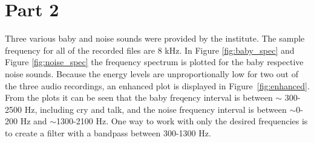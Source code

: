 \newpage
\section{Part 2}
Three various baby and noise sounds were provided by the institute. The sample
frequency for all of the recorded files are 8 kHz. In Figure
\ref{fig:baby_spec} and Figure \ref{fig:noise_spec} the frequency spectrum is
plotted for the baby respective noise sounds. Because the energy levels are
unproportionally low for two out of the three audio recordings, an enhanced
plot is displayed in Figure~\ref{fig:enhanced}.  From the plots it can be seen
that the baby freqency interval is between $\sim$ 300-2500 Hz, including cry
and talk, and the noise frequency interval is between $\sim$0-200 Hz and
$\sim$1300-2100 Hz. One way to work with only the desired frequencies is to
create a filter with a bandpass between 300-1300 Hz. 

%

